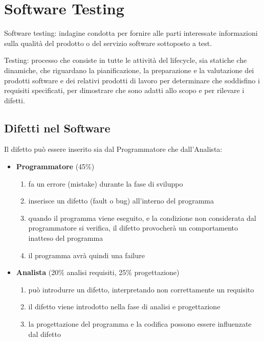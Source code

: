 \section{Software Testing}

\begin{mdframed}
    Software testing: indagine condotta per fornire alle parti interessate informazioni sulla qualità del prodotto o del servizio software sottoposto a test.
\end{mdframed}
\begin{mdframed}
    Testing: processo che consiste in tutte le attività del lifecycle, sia statiche che dinamiche, che riguardano la pianificazione, la preparazione e la valutazione dei prodotti software e dei relativi prodotti di lavoro per determinare che soddisfino i requisiti specificati, per dimostrare che sono adatti allo scopo e per rilevare i difetti.
\end{mdframed}

\subsection{Difetti nel Software}
Il difetto può essere inserito sia dal Programmatore che dall'Analista:
\begin{itemize}
    \item \textbf{Programmatore} (45\%)
    \begin{enumerate}
        \item fa un errore (mistake) durante la fase di sviluppo
        \item inserisce un difetto (fault o bug) all'interno del programma
        \item quando il programma viene eseguito, e la condizione non considerata dal programmatore si verifica, il difetto provocherà un comportamento inatteso del programma
        \item il programma avrà quindi una failure
    \end{enumerate}
    \item \textbf{Analista} (20\% analisi requisiti, 25\% progettazione)
    \begin{enumerate}
        \item può introdurre un difetto, interpretando non correttamente un requisito
        \item il difetto viene introdotto nella fase di analisi e progettazione
        \item la progettazione del programma e la codifica possono essere influenzate dal difetto
    \end{enumerate}
\end{itemize}

